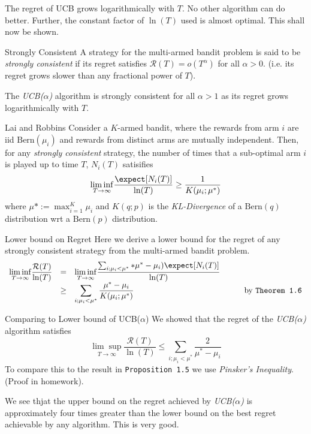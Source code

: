 \documentclass[11pt,a4paper]{article}
\begin{document}
  \begin{remark}{The regret of UCB grows logarithmically with $T$. No other algorithm can do better.}
    Further, the constant factor of $\ln(T)$ used is almost optimal. This shall now be shown.
  \end{remark}

  \begin{definition}{Strongly Consistent}
    A strategy for the multi-armed bandit problem is said to be \textit{strongly consistent} if its regret satisfies $\mathcal{R}(T)=o(T^\alpha)$ for all $\alpha>0$. (i.e. its regret grows slower than any fractional power of $T$).
    \par The \textit{UCB($\alpha$)} algorithm is strongly consistent for all $\alpha>1$ as its regret grows logarithmically with $T$.
  \end{definition}

  \begin{theorem}{Lai and Robbins}
    Consider a $K$-armed bandit, where the rewards from arm $i$ are iid $\text{Bern}(\mu_i)$ and rewards from distinct arms are mutually independent. Then, for any \textit{strongly consistent} strategy, the number of times that a sub-optimal arm $i$ is played up to time $T$, $N_i(T)$ satisifies
    \[ \underset{T\to\infty}{\lim\inf}\frac{\expect[N_i(T)]}{\ln(T)}\geq\frac1{K(\mu_i;\mu^*)} \]
    where $\mu*:=\max_{i=1}^K\mu_i$ and $K(q;p)$ is the \textit{KL-Divergence} of a $\text{Bern}(q)$ distribution wrt a $\text{Bern}(p)$ distribution.
  \end{theorem}

  \begin{proposition}{Lower bound on Regret}
    Here we derive a lower bound for the regret of any strongly consistent strategy from the multi-armed bandit problem.
    \[\begin{array}{rclcl}
    \underset{T\to\infty}{\lim\inf}\dfrac{\mathcal{R}(T)}{\ln(T)}&=&\underset{T\to\infty}{\lim\inf}\dfrac{\sum_{i;\mu_i<\mu^*}*\mu^*-\mu_i)\expect[N_i(T)]}{\ln(T)}&\quad&\\
    &\geq&\displaystyle\sum_{i;\mu_i<\mu^*}\frac{\mu^*-\mu_i}{K(\mu_i;\mu^*)}&&\text{by \texttt{Theorem 1.6}}
    \end{array}\]
  \end{proposition}

  \begin{proposition}{Comparing to Lower bound of UCB($\alpha$)}
    We showed that the regret of the \textit{UCB($\alpha$)} algorithm satisfies
    \[ \underset{T\to\infty}{\lim\sup}\frac{\mathcal{R}(T)}{\ln(T)}\leq\sum_{i;\mu_i<\mu^*}\frac2{\mu^*-\mu_i} \]
    To compare this to the result in \texttt{Proposition 1.5} we use \textit{Pinsker's Inequality}. (Proof in homework).
    \par We see thjat the upper bound on the regret achieved by \textit{UCB($\alpha$)} is approximately four times greater than the lower bound on the best regret achievable by any algorithm. This is very good.
  \end{proposition}
\end{document}
